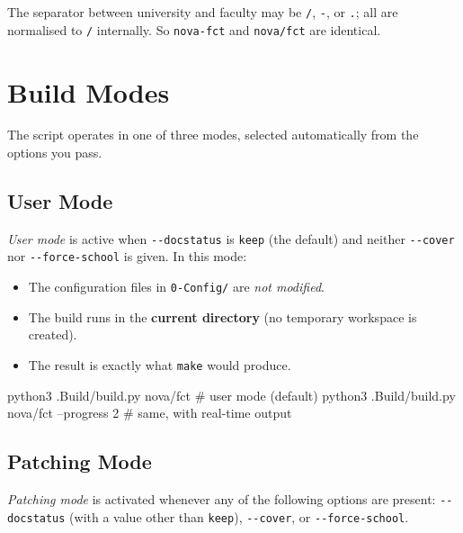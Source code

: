 The separator between university and faculty may be \verb!/!, \verb!-!, or
\verb!.!; all are normalised to \verb!/! internally.  So \verb!nova-fct!
and \verb!nova/fct! are identical.


\section{Build Modes}
\label{sec:buildpy_modes}

The script operates in one of three modes, selected automatically from the
options you pass.

\subsection{User Mode}
\label{sec:buildpy_user_mode}

\emph{User mode} is active when \verb!--docstatus! is \texttt{keep} (the
default) and neither \verb!--cover! nor \verb!--force-school! is given.
In this mode:

\begin{itemize}
  \item The configuration files in \verb!0-Config/! are \emph{not modified}.
  \item The build runs in the \textbf{current directory} (no temporary
        workspace is created).
  \item The result is exactly what \texttt{make} would produce.
\end{itemize}

\begin{bashcode}
python3 .Build/build.py nova/fct         # user mode (default)
python3 .Build/build.py nova/fct --progress 2  # same, with real-time output
\end{bashcode}

\subsection{Patching Mode}
\label{sec:buildpy_patching_mode}

\emph{Patching mode} is activated whenever any of the following options are
present: \verb!--docstatus! (with a value other than \texttt{keep}),
\verb!--cover!, or \verb!--force-school!.


